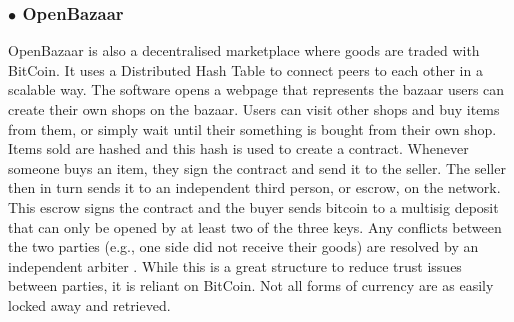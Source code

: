 \subsubsection*{$\bullet$ OpenBazaar}
OpenBazaar \cite{bazaar} is also a decentralised marketplace where goods are traded with BitCoin.
It uses a Distributed Hash Table to connect peers to each other in a scalable way.
The software opens a webpage that represents the bazaar users can create their own shops on the bazaar.
Users can visit other shops and buy items from them, or simply wait until their something is bought from their own shop.
Items sold are hashed and this hash is used to create a contract.
Whenever someone buys an item, they sign the contract and send it to the seller.
The seller then in turn sends it to an independent third person, or escrow, on the network.
This escrow signs the contract and the buyer sends bitcoin to a multisig deposit that can only be opened by at least two of the three keys.
Any conflicts between the two parties (e.g., one side did not receive their goods) are resolved by an independent arbiter \cite{bazaarDisputeResolution}.
While this is a great structure to reduce trust issues between parties, it is reliant on BitCoin.
Not all forms of currency are as easily locked away and retrieved.
